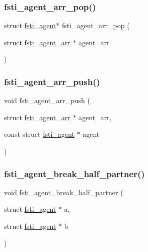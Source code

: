 \mbox{\label{fsti-agent_8h_a140245276760c5ca1467b816dfdb16d9}} 
\subsubsection{\texorpdfstring{fsti\+\_\+agent\+\_\+arr\+\_\+pop()}{fsti\_agent\_arr\_pop()}}
{\footnotesize\ttfamily struct \mbox{\hyperlink{structfsti__agent}{fsti\+\_\+agent}}$\ast$ fsti\+\_\+agent\+\_\+arr\+\_\+pop (\begin{DoxyParamCaption}\item[{struct \mbox{\hyperlink{structfsti__agent__arr}{fsti\+\_\+agent\+\_\+arr}} $\ast$}]{agent\+\_\+arr }\end{DoxyParamCaption})}

\mbox{\label{fsti-agent_8h_a0cf9bb69026e48287e83f9d73841f90f}} 
\subsubsection{\texorpdfstring{fsti\+\_\+agent\+\_\+arr\+\_\+push()}{fsti\_agent\_arr\_push()}}
{\footnotesize\ttfamily void fsti\+\_\+agent\+\_\+arr\+\_\+push (\begin{DoxyParamCaption}\item[{struct \mbox{\hyperlink{structfsti__agent__arr}{fsti\+\_\+agent\+\_\+arr}} $\ast$}]{agent\+\_\+arr,  }\item[{const struct \mbox{\hyperlink{structfsti__agent}{fsti\+\_\+agent}} $\ast$}]{agent }\end{DoxyParamCaption})}

\mbox{\label{fsti-agent_8h_a69108c3779a3689185b833a70f589225}} 
\subsubsection{\texorpdfstring{fsti\+\_\+agent\+\_\+break\+\_\+half\+\_\+partner()}{fsti\_agent\_break\_half\_partner()}}
{\footnotesize\ttfamily void fsti\+\_\+agent\+\_\+break\+\_\+half\+\_\+partner (\begin{DoxyParamCaption}\item[{struct \mbox{\hyperlink{structfsti__agent}{fsti\+\_\+agent}} $\ast$}]{a,  }\item[{struct \mbox{\hyperlink{structfsti__agent}{fsti\+\_\+agent}} $\ast$}]{b }\end{DoxyParamCaption})}

